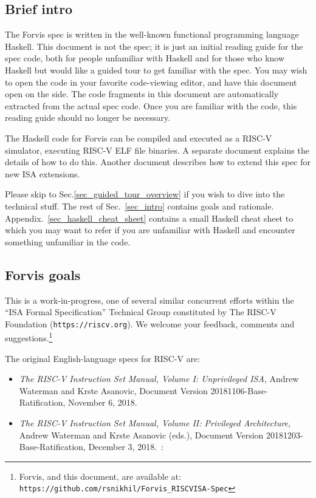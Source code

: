\documentclass[11pt]{article}
\begin{document}
\subsection{Brief intro}

\label{sec_how_to_read}

The Forvis spec is written in the well-known functional programming
language Haskell.  This document is not the spec; it is just an
initial reading guide for the spec code, both for people unfamiliar
with Haskell and for those who know Haskell but would like a guided
tour to get familiar with the spec.  You may wish to open the code in
your favorite code-viewing editor, and have this document open on the
side.  The code fragments in this document are automatically extracted
from the actual spec code.  Once you are familiar with the code, this
reading guide should no longer be necessary.

The Haskell code for Forvis can be compiled and executed as a RISC-V
simulator, executing RISC-V ELF file binaries.  A separate document
explains the details of how to do this.  Another document describes
how to extend this spec for new ISA extensions.

Please skip to Sec.\ref{sec_guided_tour_overview} if you wish to dive
into the technical stuff.  The rest of Sec.~\ref{sec_intro} contains
goals and rationale.  Appendix.~\ref{sec_haskell_cheat_sheet} contains a
small Haskell cheat sheet to which you may want to refer if you are
unfamiliar with Haskell and encounter something unfamiliar in the
code.


\subsection{Forvis goals}

This is a work-in-progress, one of several similar concurrent efforts
within the ``ISA Formal Specification'' Technical Group constituted by
The RISC-V Foundation ({\tt https://riscv.org}).  We welcome your
feedback, comments and suggestions.\footnote{Forvis, and this
document, are available at: {\tt https://github.com/rsnikhil/Forvis\_RISCV\-ISA-Spec}}

The original English-language specs for RISC-V are:
\begin{itemize}

\item {\it The RISC-V Instruction Set Manual, Volume I: Unprivileged ISA},
    Andrew Waterman and Krste Asanovic,
    Document Version 20181106-Base-Ratification,
    November 6, 2018.~\cite{Waterman2018_user}

\item {\it The RISC-V Instruction Set Manual, Volume II: Privileged
    Architecture}, 
    Andrew Waterman and Krste Asanovic (eds.),
    Document Version 20181203-Base-Ratification,
    December 3, 2018.~\cite{Waterman2018_priv}:

\end{itemize}
\end{document}
